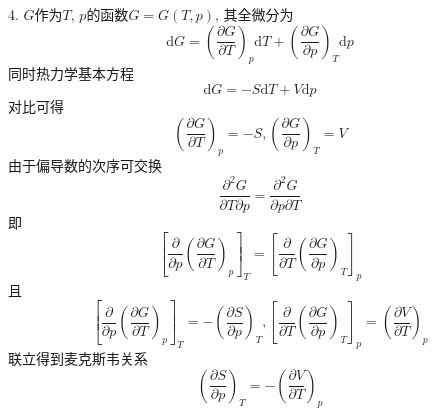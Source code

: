4.
$G$作为$T$, $p$的函数$G=G(T,p)$, 其全微分为
\begin{equation}
    \mathrm{d}G=\left( \frac{\partial G}{\partial T} \right) _p \mathrm{d}T+\left( \frac{\partial G}{\partial p} \right) _T \mathrm{d}p
\end{equation}
同时热力学基本方程
\begin{equation}
    \mathrm{d}G=-S\mathrm{d}T+V\mathrm{d}p
\end{equation}
对比可得
\begin{equation}
    \left( \frac{\partial G}{\partial T} \right) _p=-S,\left( \frac{\partial G}{\partial p} \right) _T=V
\end{equation}
由于偏导数的次序可交换
\begin{equation}
    \frac{\partial ^2G}{\partial T\partial p}=\frac{\partial ^2G}{\partial p\partial T}
\end{equation}
即
\begin{equation}
    \left[ \frac{\partial}{\partial p}\left( \frac{\partial G}{\partial T} \right) _p \right] _T=\left[ \frac{\partial}{\partial T}\left( \frac{\partial G}{\partial p} \right) _T \right] _p
\end{equation}
且
\begin{equation}
    \left[ \frac{\partial}{\partial p}\left( \frac{\partial G}{\partial T} \right) _p \right] _T=-\left( \frac{\partial S}{\partial p} \right) _T,\left[ \frac{\partial}{\partial T}\left( \frac{\partial G}{\partial p} \right) _T \right] _p=\left( \frac{\partial V}{\partial T} \right) _p
\end{equation}
联立得到麦克斯韦关系
\begin{equation}
    \left( \frac{\partial S}{\partial p} \right) _T=-\left( \frac{\partial V}{\partial T} \right) _p
\end{equation}









\subsection{}












\subsection{}












\subsection{}
